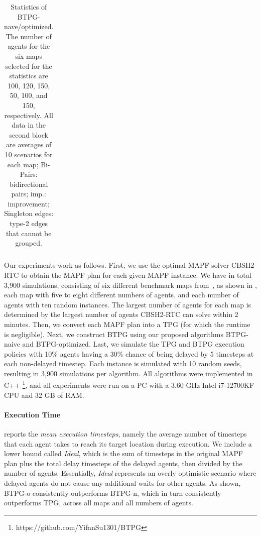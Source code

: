 \documentclass[letterpaper]{article} %
\theoremstyle{definition}
\begin{document}
\begin{table}[th!]
{\begin{tabular}{|c|c|c|c|c|c|c|c|c|c|c|c|c|}
    \end{tabular}}

   \caption{Statistics of BTPG-nave/optimized. The number of agents for the six maps selected for the statistics are 100, 120, 150, 50, 100, and 150, respectively. All data in the second block are averages of 10 scenarios for each map; Bi-Pairs: bidirectional pairs; imp.: improvement; Singleton edges: type-2 edges that cannot be grouped. %
   }
   \label{tab:Statistics of BTPG-naive}
 \end{table}

Our experiments work as follows. First, we use the optimal MAPF solver CBSH2-RTC \cite{li_pairwise_2021} to obtain the MAPF plan for each given MAPF instance. We have in total 3,900 simulations, consisting of six different benchmark maps from~\cite{stern_multi-agent_2021}, as shown in , each map with five to eight different numbers of agents, and each number of agents with ten random instances. The largest number of agents for each map is determined by the largest number of agents CBSH2-RTC can solve within 2 minutes.
Then, we convert each MAPF plan into a TPG (for which the runtime is negligible).
Next, we construct BTPG using our proposed algorithms BTPG-naive and BTPG-optimized. Last, we simulate the TPG and BTPG execution policies with 10\% agents having a 30\% chance of being delayed by 5 timesteps at each non-delayed timestep. Each instance is simulated with 10 random seeds, resulting in 3,900 simulations per algorithm.
All algorithms were implemented in C++ \footnote{https://github.com/YifanSu1301/BTPG}, and all experiments were run on a PC with a 3.60 GHz Intel i7-12700KF CPU and 32 GB of RAM.


\paragraph{Execution Time}  reports the \emph{mean execution timesteps}, namely the average number of timesteps that each agent takes to reach its target location during execution. We include a lower bound called \emph{Ideal}, which is the sum of timesteps in the original MAPF plan plus the total delay timesteps of the delayed agents, then divided by the number of agents. Essentially, \emph{Ideal} represents an overly optimistic scenario where delayed agents do not cause any additional waits for other agents. As shown, BTPG-o consistently outperforms BTPG-n, which in turn consistently outperforms TPG, across all maps and all numbers of agents.
\end{document}
